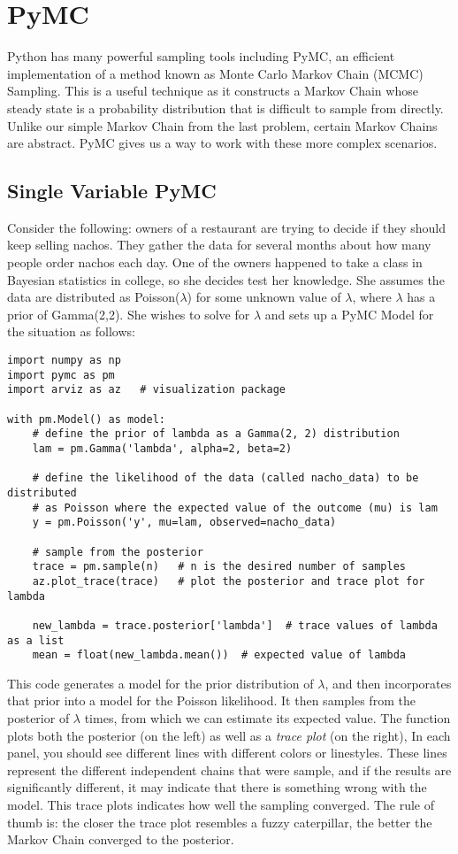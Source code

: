 \section*{PyMC}
Python has many powerful sampling tools including PyMC, an efficient implementation of a method known as Monte Carlo Markov Chain (MCMC) Sampling.
This is a useful technique as it constructs a Markov Chain whose steady state is a probability distribution that is difficult to sample from directly.
Unlike our simple Markov Chain from the last problem, certain Markov Chains are abstract. PyMC gives us a way to work with these more complex scenarios.

\subsection*{Single Variable PyMC}
Consider the following: owners of a restaurant are trying to decide if they should keep selling nachos.
They gather the data for several months about how many people order nachos each day.
One of the owners happened to take a class in Bayesian statistics in college, so she decides test her knowledge.
She assumes the data are distributed as Poisson($\lambda$) for some unknown value of $\lambda$, where $\lambda$ has a prior of Gamma(2,2).
She wishes to solve for $\lambda$ and sets up a PyMC Model for the situation as follows:

\begin{lstlisting}
import numpy as np
import pymc as pm
import arviz as az   # visualization package

with pm.Model() as model:
    # define the prior of lambda as a Gamma(2, 2) distribution
    lam = pm.Gamma('lambda', alpha=2, beta=2)

    # define the likelihood of the data (called nacho_data) to be distributed
    # as Poisson where the expected value of the outcome (mu) is lam
    y = pm.Poisson('y', mu=lam, observed=nacho_data)

    # sample from the posterior
    trace = pm.sample(n)   # n is the desired number of samples
    az.plot_trace(trace)   # plot the posterior and trace plot for lambda

    new_lambda = trace.posterior['lambda']  # trace values of lambda as a list
    mean = float(new_lambda.mean())  # expected value of lambda
\end{lstlisting}

This code generates a model for the prior distribution of $\lambda$, and then incorporates that prior into a model for the Poisson likelihood.
It then samples from the posterior of $\lambda$  times, from which we can estimate its expected value.
The function  plots both the posterior (on the left) as well as a \emph{trace plot} (on the right),
In each panel, you should see different lines with different colors or linestyles.
These lines represent the different independent chains that were sample, and if the results are significantly different, it may indicate that there is something wrong with the model.
This trace plots indicates how well the sampling converged.
The rule of thumb is: the closer the trace plot resembles a fuzzy caterpillar, the better the Markov Chain converged to the posterior.


